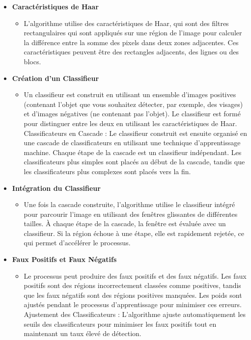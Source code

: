 \documentclass{article}
\begin{document}
\begin{itemize}
    \item \textbf{Caractéristiques de Haar}
    \begin{itemize}
        \item L'algorithme utilise des caractéristiques de Haar,
        qui sont des filtres rectangulaires qui sont appliqués sur une région de l'image
        pour calculer la différence entre la somme des pixels dans deux zones adjacentes.
        Ces caractéristiques peuvent être des rectangles adjacents, des lignes ou des
        blocs. 
    \end{itemize}

    \item \textbf{Création d'un Classifieur}
    \begin{itemize}
        \item Un classifieur est construit en utilisant un
        ensemble d'images positives (contenant l'objet que vous souhaitez détecter, par
        exemple, des visages) et d'images négatives (ne contenant pas l'objet). Le
        classifieur est formé pour distinguer entre les deux en utilisant les
        caractéristiques de Haar. Classificateurs en Cascade : Le classifieur construit
        est ensuite organisé en une cascade de classificateurs en utilisant une
        technique d'apprentissage machine. Chaque étape de la cascade est un classifieur
        indépendant. Les classificateurs plus simples sont placés au début de la cascade,
        tandis que les classificateurs plus complexes sont placés vers la fin.
    \end{itemize}

    \item \textbf{Intégration du Classifieur}
    \begin{itemize}
        \item Une fois la cascade construite, l'algorithme
        utilise le classifieur intégré pour parcourir l'image en utilisant des fenêtres
        glissantes de différentes tailles. À chaque étape de la cascade, la fenêtre est
        évaluée avec un classifieur. Si la région échoue à une étape, elle est
        rapidement rejetée, ce qui permet d'accélérer le processus. 
    \end{itemize}

    \item \textbf{Faux Positifs et Faux Négatifs }
    \begin{itemize}
        \item Le processus peut produire des faux positifs et des faux
        négatifs. Les faux positifs sont des régions incorrectement classées comme
        positives, tandis que les faux négatifs sont des régions positives manquées. Les
        poids sont ajustés pendant le processus d'apprentissage pour minimiser ces
        erreurs. Ajustement des Classificateurs : L'algorithme ajuste automatiquement
        les seuils des classificateurs pour minimiser les faux positifs tout en
        maintenant un taux élevé de détection.
    \end{itemize}

    
\end{itemize}
\end{document}

